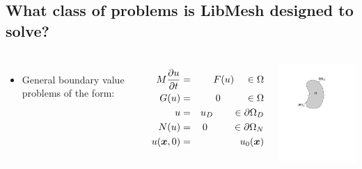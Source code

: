 \subsection*{What class of problems is LibMesh designed to solve?}
\begin{frame}[t]
  \begin{columns}[t]
     \begin{itemize}
      \item General boundary value problems of the form:
      \end{itemize}
      \vspace{-.1in}
        \begin{eqnarray}
	\label{eqn:general_pde}
	\nonumber
	M \frac{\partial u}{\partial t} & = & F( u ) \;\;\;\; \in \Omega
        \\
	\nonumber
	G( u ) & = & 0 \;\;\;\;\;\;\;\;\; \in \Omega
	\\
	\nonumber
	u & = & u_D \;\;\;\;\;\;\; \in \partial \Omega_D
	\\
	\nonumber
	N(u) & = & 0 \;\;\;\;\;\;\;\;\; \in \partial \Omega_N
 	\\
 	\nonumber
 	u({\boldsymbol{x}}, 0) & = & u_0({\boldsymbol{x}}) 
      \end{eqnarray}
      \begin{center}
	\includegraphics[viewport=140 420 400 685,clip=true,width=2in]{figures/domain2/domain2_input}
      \end{center}
  \end{columns}
\end{frame}
